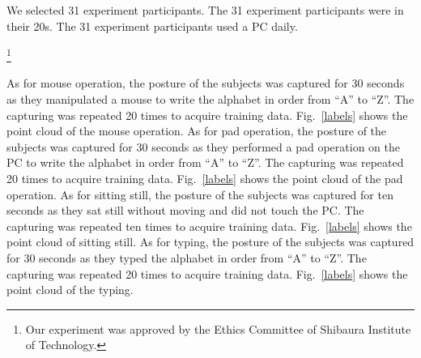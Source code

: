 \begin{revisedblock}
We selected 31 experiment participants.
  The 31 experiment participants were in their 20s.
  The 31 experiment participants used a PC daily.
\end{revisedblock}

\footnote{Our experiment was approved by the Ethics Committee of Shibaura Institute of Technology.}

\begin{deletedblock}
As for mouse operation, the posture of the subjects was captured for 30 seconds as they manipulated a mouse to write the alphabet in order from ``A'' to ``Z''. The capturing was repeated 20 times to acquire training data. 
    Fig.~\ref{labels} shows the point cloud of the mouse operation. 
As for pad operation, the posture of the subjects was captured for 30 seconds as they performed a pad operation on the PC to write the alphabet in order from ``A'' to ``Z''. The capturing was repeated 20 times to acquire training data. 
    Fig.~\ref{labels} shows the point cloud of the pad operation. 
As for sitting still, the posture of the subjects was captured for ten  seconds as they sat still without moving and did not touch the PC. The capturing was repeated ten times to acquire training data. 
    Fig.~\ref{labels} shows the point cloud of sitting still. 
As for typing, the posture of the subjects was captured for 30 seconds as they typed the alphabet in order from ``A'' to ``Z''. The capturing was repeated 20 times to acquire training data. 
    Fig.~\ref{labels} shows the point cloud of the typing. 
\end{deletedblock}

